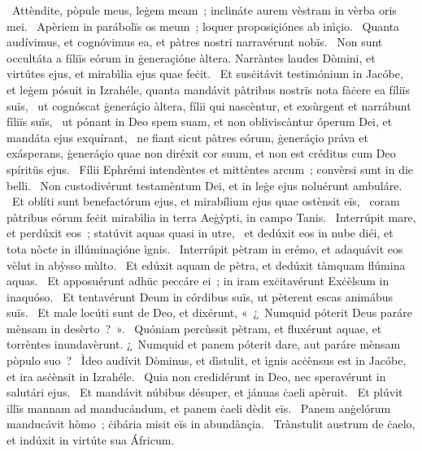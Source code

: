 \psalmChapterWithInscription{}
{ }
{%
~Attèndite, pòpule meus, leġem meam~; inclináte aurem vèstram in vèrba oris mei. 
~Apèriem in parábolïs os meum~; loquer proposiçiónes ab inìçio. 
~Quanta audívimus, et cognóvimus ea, et pàtres nostri narravérunt nobïs. 
~Non sunt occultáta a fíliïs eórum in ġeneraçióne àltera. Narràntes laudes Dòmini, et virtútes ejus, et mirabìlia ejus quae feċit. 
~Et susċitávit testimónium in Jacóbe, et leġem pósuit in Izrahéle, quanta mandávit pàtribus nostrïs nota fàċere ea fíliïs suïs, 
~ut cognóscat ġeneráçio àltera, fílii qui nascèntur, et exsùrgent et narrábunt fíliïs suïs, 
~ut pónant in Deo spem suam, et non obliviscàntur óperum Dei, et mandáta ejus exquírant, 
~ne fiant sicut pàtres eórum, ġeneráçio práva et exásperans, ġeneráçio quae non diréxit cor suum, et non est créditus cum Deo spíritüs ejus. 
~Fílii Ephrémi intendèntes et mittèntes arcum~; convèrsi sunt in die belli. 
~Non custodivérunt testamèntum Dei, et in leġe ejus noluérunt ambuláre. 
~Et oblíti sunt benefactórum ejus, et mirabílium ejus quae ostènsit eïs, 
~coram pàtribus eórum feċit mirabìlia in terra Aeġỳpti, in campo Tanis. 
~Interrúpit mare, et perdúxit eos~; statúvit aquas quasi in utre, 
~et dedúxit eos in nube diéi, et tota nòcte in illúminaçióne ìgnis. 
~Interrúpit pètram in erémo, et adaquávit eos vèlut in abỳsso mùlto. 
~Et edúxit aquam de pètra, et dedúxit tàmquam flúmina aquas. 
~Et apposuérunt adhüc peccáre ei~; in iram exċitavérunt Exċèlsum in inaquóso. 
~Et tentavérunt Deum in córdibus suïs, ut pèterent escas animábus suïs. 
~Et male locúti sunt de Deo, et dixérunt, «~¿~Numquid póterit Deus paráre mènsam in desèrto~?~». 
~Quóniam percùssit pètram, et fluxérunt aquae, et torrèntes inundavèrunt. ¿~Numquid et panem póterit dare, aut paráre mènsam pòpulo suo~? 
~Ìdeo audívit Dòminus, et dìstulit, et ìgnis acċènsus est in Jacóbe, et ira asċènsit in Izrahéle. 
~Quia non credidérunt in Deo, nec speravérunt in salutári ejus. 
~Et mandávit núbibus désuper, et jánuas ċaeli apèruit. 
~Et plúvit illïs mannam ad manducándum, et panem ċaeli dèdit eïs. 
~Panem anġelórum manducávit hòmo~; ċibária misit eïs in abundànçia. 
~Trànstulit austrum de ċaelo, et indúxit in virtúte sua Áfricum. 
}
